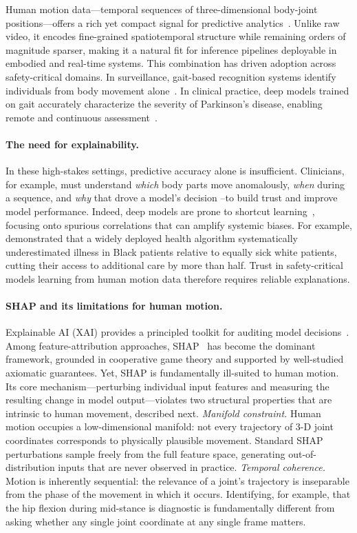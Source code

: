 Human motion data—temporal sequences of three-dimensional body-joint
positions—offers a rich yet compact signal for predictive
analytics~\citep{ionescu2013human3}. Unlike raw video,
it encodes fine-grained spatiotemporal structure while remaining orders of
magnitude sparser, making it a natural fit for inference pipelines 
deployable in embodied and real-time systems. This combination has driven adoption across safety-critical
domains. In surveillance, gait-based recognition systems identify
individuals from body movement alone~\citep{sepas2022deep}.
In clinical practice, deep models trained on gait accurately characterize
the severity of Parkinson's disease, enabling remote and continuous
assessment~\citep{eskofier2016recent,el2020deep}.

\paragraph{The need for explainability.}
In these high-stakes settings, predictive accuracy alone is insufficient.
Clinicians, for example, must understand \emph{which} body parts
move anomalously, \emph{when} during a sequence, and \emph{why} that
drove a model's decision --to build trust and improve model performance. Indeed, deep models
are prone to shortcut learning~\citep{geirhos2020shortcut}, focusing onto
spurious correlations that can amplify systemic biases.
For example, \citet{obermeyer2019dissecting} demonstrated
that a widely deployed health algorithm systematically underestimated
illness in Black patients relative to equally sick white patients, cutting
their access to additional care by more than half. Trust in
safety-critical models learning from human motion data therefore requires reliable explanations.

\paragraph{SHAP and its limitations for human motion.}
Explainable AI (XAI) provides a principled toolkit for auditing model
decisions~\citep{arrieta2020explainable,guidotti2018survey}.  Among
feature-attribution approaches, SHAP~\citep{lundberg2017unified} has
become the dominant framework, grounded in cooperative game theory and
supported by well-studied axiomatic
guarantees. Yet, SHAP is fundamentally
ill-suited to human motion.  Its core mechanism---perturbing individual
input features and measuring the resulting change in model
output---violates two structural properties that are intrinsic to human
movement, described next. \textit{Manifold constraint.}  Human motion occupies a low-dimensional
manifold: not every trajectory of 3-D joint coordinates corresponds to
physically plausible movement.  Standard SHAP perturbations sample freely
from the full feature space, generating out-of-distribution inputs that are
never observed in practice. \textit{Temporal coherence.}  Motion is inherently sequential: the
relevance of a joint's trajectory is inseparable from the phase of the
movement in which it occurs. Identifying, for example, that the hip flexion
during mid-stance is diagnostic is fundamentally different from asking
whether any single joint coordinate at any single frame
matters.

